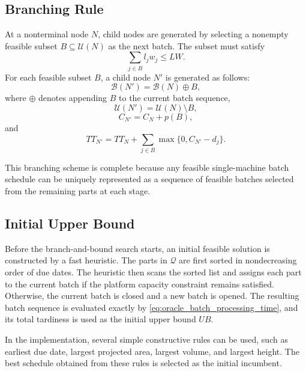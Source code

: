 \documentclass[review,3p,times,authoryear]{elsarticle}
\begin{document}
\subsection{Branching Rule}

At a nonterminal node $N$, child nodes are generated by selecting a nonempty
feasible subset $B\subseteq \mathcal{U}(N)$ as the next batch. The subset
must satisfy
\begin{equation}
	\sum_{j\in B} l_jw_j \le LW .
\end{equation}
For each feasible subset $B$, a child node $N'$ is generated as follows:
\begin{equation}
	\mathcal{B}(N')
	=
	\mathcal{B}(N)\oplus B,
\end{equation}
where $\oplus$ denotes appending $B$ to the current batch sequence,
\begin{equation}
	\mathcal{U}(N')
	=
	\mathcal{U}(N)\setminus B,
\end{equation}
\begin{equation}
	C_{N'}
	=
	C_N+p(B),
\end{equation}
and
\begin{equation}
	TT_{N'}
	=
	TT_N
	+
	\sum_{j\in B}
	\max\{0,C_{N'}-d_j\}.
\end{equation}

This branching scheme is complete because any feasible single-machine batch
schedule can be uniquely represented as a sequence of feasible batches
selected from the remaining parts at each stage.

\subsection{Initial Upper Bound}

Before the branch-and-bound search starts, an initial feasible solution is
constructed by a fast heuristic. The parts in $\mathcal{Q}$ are first sorted
in nondecreasing order of due dates. The heuristic then scans the sorted
list and assigns each part to the current batch if the platform capacity
constraint remains satisfied. Otherwise, the current batch is closed and a
new batch is opened. The resulting batch sequence is evaluated exactly by
\eqref{eq:oracle_batch_processing_time}, and its total tardiness is used as
the initial upper bound $UB$.

In the implementation, several simple constructive rules can be used, such
as earliest due date, largest projected area, largest volume, and largest
height. The best schedule obtained from these rules is selected as the
initial incumbent.
\end{document}
